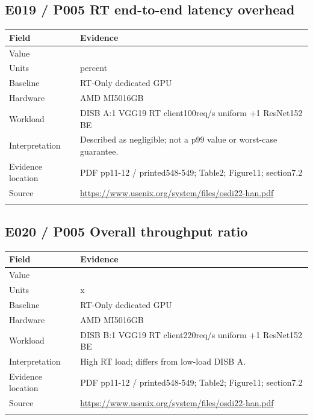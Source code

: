 \subsection*{E019 / P005 RT end-to-end latency overhead}

\begin{longtable}{>{\raggedright\arraybackslash}p{}>{\raggedright\arraybackslash}p{}}
\toprule
\textbf{Field} & \textbf{Evidence}\\\midrule\endhead
Value & 0.5\\\addlinespace
Units & percent\\\addlinespace
Baseline & RT-Only dedicated GPU\\\addlinespace
Hardware & AMD MI5016GB\\\addlinespace
Workload & DISB A:1 VGG19 RT client100req/s uniform +1 ResNet152 BE\\\addlinespace
Interpretation & Described as negligible; not a p99 value or worst-case guarantee.\\\addlinespace
Evidence location & PDF pp11-12 / printed548-549; Table2; Figure11; section7.2\\\addlinespace
Source & \url{https://www.usenix.org/system/files/osdi22-han.pdf}\\\addlinespace
\bottomrule\end{longtable}

\subsection*{E020 / P005 Overall throughput ratio}

\begin{longtable}{>{\raggedright\arraybackslash}p{}>{\raggedright\arraybackslash}p{}}
\toprule
\textbf{Field} & \textbf{Evidence}\\\midrule\endhead
Value & 1.14\\\addlinespace
Units & x\\\addlinespace
Baseline & RT-Only dedicated GPU\\\addlinespace
Hardware & AMD MI5016GB\\\addlinespace
Workload & DISB B:1 VGG19 RT client220req/s uniform +1 ResNet152 BE\\\addlinespace
Interpretation & High RT load; differs from low-load DISB A.\\\addlinespace
Evidence location & PDF pp11-12 / printed548-549; Table2; Figure11; section7.2\\\addlinespace
Source & \url{https://www.usenix.org/system/files/osdi22-han.pdf}\\\addlinespace
\bottomrule\end{longtable}

